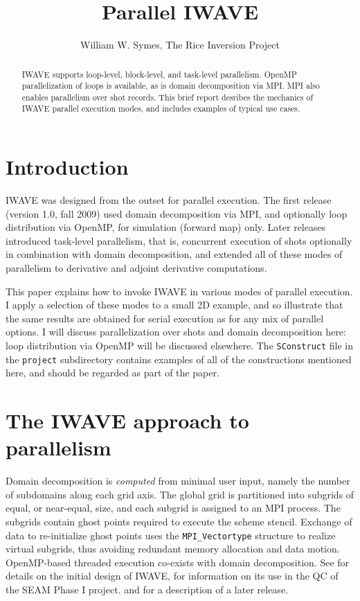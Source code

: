 \title{Parallel IWAVE}
\date{}
\author{William W. Symes, The Rice Inversion Project}


\maketitle
\parskip 12pt
\begin{abstract}
IWAVE supports loop-level, block-level, and task-level parallelism. OpenMP parallelization of loops is available, as is domain decomposition via MPI. MPI also enables parallelism over shot records. This brief report desribes the mechanics of IWAVE parallel execution modes, and includes examples of typical use cases. 
\end{abstract}

\section{Introduction}
IWAVE was designed from the outset for parallel execution. The first release (version 1.0, fall 2009) used domain decomposition via MPI, and optionally loop distribution via OpenMP, for simulation (forward map) only. Later releases introduced task-level parallelism, that is, concurrent execution of shots optionally in combination with domain decomposition, and extended all of these modes of parallelism to derivative and adjoint derivative computations.

This paper explains how to invoke IWAVE in various modes of parallel execution. I apply a selection of these modes to a small 2D example, and so illustrate that the same results are obtained for serial execution as for any mix of parallel options. I will discuss parallelization over shots and domain decomposition here: loop distribution via OpenMP will be discussed elsewhere. The {\tt SConstruct} file in the {\tt project} subdirectory contains examples of all of the constructions mentioned here, and should be regarded as part of the paper.

\section{The IWAVE approach to parallelism}

Domain decomposition is {\em computed} from minimal user input, namely the number of subdomains along each grid axis. The global grid is partitioned into subgrids of equal, or near-equal, size, and each subgrid is assigned to an MPI process. The subgrids contain ghost points required to execute the scheme stencil. Exchange of data to re-initialize ghost points uses the {\tt MPI\_Vectortype} structure to realize virtual subgrids, thus avoiding redundant memory allocation and data motion. OpenMP-based threaded execution co-exists with domain decomposition. See \cite{Terentyev:09a} for details on the initial design of IWAVE, \cite{FehlerKeliher:11} for information on its use in the QC of the SEAM Phase I project. and \cite{GeoPros:11} for a description of a later release.

